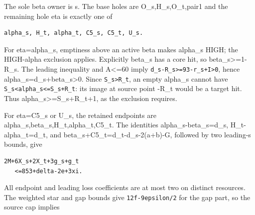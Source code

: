 \documentclass[10pt,a4paper]{article}
\theoremstyle{definition}
\begin{document}
The sole beta owner is s. The base holes are O\_\allowbreak{}s,\allowbreak{}H\_\allowbreak{}s,\allowbreak{}O\_\allowbreak{}t,\allowbreak{}pair1 and
the remaining hole eta is exactly one of

\begin{lstlisting}
alpha_s, H_t, alpha_t, C5_s, C5_t, U_s.
\end{lstlisting}

For eta=\allowbreak{}alpha\_\allowbreak{}s,\allowbreak{} emptiness above an active beta makes alpha\_\allowbreak{}s HIGH;
the HIGH-alpha exclusion applies. Explicitly beta\_\allowbreak{}s has a core hit,\allowbreak{} so
beta\_\allowbreak{}s\textgreater=\allowbreak{}1-R\_\allowbreak{}s. The leading inequality and A\textless=\allowbreak{}60
imply \texttt{d\_\allowbreak{}\allowbreak{}s-R\_\allowbreak{}\allowbreak{}s>=\allowbreak{}93-r\_\allowbreak{}\allowbreak{}s+\allowbreak{}I>0},\allowbreak{} hence
alpha\_\allowbreak{}s=\allowbreak{}d\_\allowbreak{}s+\allowbreak{}beta\_\allowbreak{}s\textgreater0. Since
\texttt{S\_\allowbreak{}\allowbreak{}s>R\_\allowbreak{}\allowbreak{}t},\allowbreak{} an empty alpha\_\allowbreak{}s cannot have
\texttt{S\_\allowbreak{}\allowbreak{}s<alpha\_\allowbreak{}\allowbreak{}s<=\allowbreak{}S\_\allowbreak{}\allowbreak{}s+\allowbreak{}R\_\allowbreak{}\allowbreak{}t}: its image at source
point -R\_\allowbreak{}t would be a target hit. Thus
alpha\_\allowbreak{}s\textgreater=\allowbreak{}S\_\allowbreak{}s+\allowbreak{}R\_\allowbreak{}t+\allowbreak{}1,\allowbreak{} as the exclusion requires.

For eta=\allowbreak{}C5\_\allowbreak{}s or U\_\allowbreak{}s,\allowbreak{} the retained endpoints are
alpha\_\allowbreak{}s,\allowbreak{}beta\_\allowbreak{}s,\allowbreak{}H\_\allowbreak{}t,\allowbreak{}alpha\_\allowbreak{}t,\allowbreak{}C5\_\allowbreak{}t. The identities
alpha\_\allowbreak{}s-beta\_\allowbreak{}s=\allowbreak{}d\_\allowbreak{}s,\allowbreak{} H\_\allowbreak{}t-alpha\_\allowbreak{}t=\allowbreak{}d\_\allowbreak{}t,\allowbreak{} and
beta\_\allowbreak{}s+\allowbreak{}C5\_\allowbreak{}t=\allowbreak{}d\_\allowbreak{}t-d\_\allowbreak{}s-2(a+\allowbreak{}b)-G,\allowbreak{} followed by two leading-s bounds,\allowbreak{} give

\begin{lstlisting}
2M+6X_s+2X_t+3g_s+g_t
   <=853+delta-2e+3xi.
\end{lstlisting}

All endpoint and leading loss coefficients are at most two on distinct
resources. The weighted star and gap bounds give
\texttt{12f-9epsilon/\allowbreak{}2} for the gap part,\allowbreak{} so the source
cap implies
\end{document}
